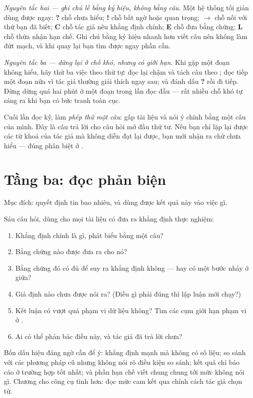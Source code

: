 \documentclass[../../english.tex]{subfiles}
\begin{document}
\emph{Nguyên tắc hai --- ghi chú lề bằng ký hiệu, không bằng câu.} Một hệ thống tối giản dùng được ngay: \textbf{?} chỗ chưa hiểu; \textbf{!} chỗ bất ngờ hoặc quan trọng; \textbf{$\to$} chỗ nối với thứ bạn đã biết; \textbf{C} chỗ tác giả nêu khẳng định chính; \textbf{E} chỗ đưa bằng chứng; \textbf{L} chỗ thừa nhận hạn chế. Ghi chú bằng ký hiệu nhanh hơn viết câu nên không làm đứt mạch, và khi quay lại bạn tìm được ngay phần cần.

\emph{Nguyên tắc ba --- dừng lại ở chỗ khó, nhưng có giới hạn.} Khi gặp một đoạn không hiểu, hãy thử ba việc theo thứ tự: đọc lại chậm và tách câu theo ; đọc tiếp một đoạn nữa vì tác giả thường giải thích ngay sau; và đánh dấu \textbf{?} rồi đi tiếp. Đừng dừng quá hai phút ở một đoạn trong lần đọc đầu --- rất nhiều chỗ khó tự sáng ra khi bạn có bức tranh toàn cục.

Cuối lần đọc kỹ, làm \emph{phép thử một câu}: gấp tài liệu và nói ý chính bằng một câu của mình. Đây là câu trả lời cho câu hỏi mở đầu thứ tư. Nếu bạn chỉ lặp lại được các từ khoá của tác giả mà không diễn đạt lại được, bạn mới nhận ra chứ chưa hiểu --- đúng phân biệt ở .

\section{Tầng ba: đọc phản biện}

Mục đích: quyết định tin bao nhiêu, và dùng được kết quả này vào việc gì.

Sáu câu hỏi, dùng cho mọi tài liệu có đưa ra khẳng định thực nghiệm:

\begin{enumerate}
\item Khẳng định chính là gì, phát biểu bằng một câu?
\item Bằng chứng nào được đưa ra cho nó?
\item Bằng chứng đó có đủ để suy ra khẳng định không --- hay có một bước nhảy ở giữa?
\item Giả định nào chưa được nói ra? (Điều gì phải đúng thì lập luận mới chạy?)
\item Kết luận có vượt quá phạm vi dữ liệu không? Tìm các cụm giới hạn phạm vi ở .
\item Ai có thể phản bác điều này, và tác giả đã trả lời chưa?
\end{enumerate}

Bốn dấu hiệu đáng ngờ cần để ý: khẳng định mạnh mà không có số liệu; so sánh với các phương pháp cũ nhưng không nói rõ điều kiện so sánh; kết quả chỉ báo cáo ở trường hợp tốt nhất; và phần hạn chế viết chung chung tới mức không nói gì. Chương  cho công cụ tinh hơn: đọc mức cam kết qua chính cách tác giả chọn từ.
\end{document}
